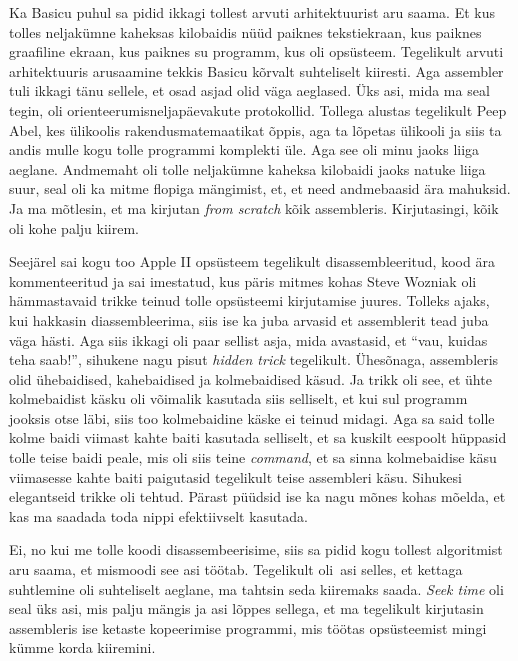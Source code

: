 
Ka Basicu puhul sa pidid ikkagi tollest arvuti arhitektuurist aru saama. Et kus 
tolles neljakümne kaheksas kilobaidis nüüd paiknes tekstiekraan, kus paiknes 
graafiline ekraan, kus paiknes su programm, kus oli opsüsteem. Tegelikult 
arvuti arhitektuuris arusaamine tekkis Basicu kõrvalt suhteliselt kiiresti. Aga 
assembler tuli ikkagi tänu sellele, et osad asjad olid väga aeglased. Üks asi, 
mida ma seal tegin, oli orienteerumisneljapäevakute protokollid. Tollega 
alustas tegelikult Peep Abel, kes ülikoolis 
rakendusmatemaatikat õppis, aga ta lõpetas ülikooli ja siis ta andis mulle kogu 
tolle programmi komplekti üle. Aga see oli minu jaoks liiga aeglane. Andmemaht 
oli tolle  neljakümne kaheksa kilobaidi jaoks natuke liiga suur, seal oli ka 
mitme flopiga mängimist, et, et need andmebaasid ära mahuksid. Ja ma mõtlesin, 
et ma kirjutan \emph{from scratch} kõik assembleris. Kirjutasingi, kõik oli 
kohe palju kiirem. 

Seejärel sai kogu too Apple II opsüsteem tegelikult disassembleeritud, kood ära 
kommenteeritud ja sai imestatud, kus päris mitmes kohas Steve Wozniak oli 
hämmastavaid trikke teinud tolle opsüsteemi kirjutamise juures. Tolleks ajaks, 
kui hakkasin diassembleerima, siis ise ka juba arvasid et assemblerit tead juba 
väga hästi. Aga siis ikkagi oli paar sellist asja, mida avastasid, et 
\enquote{vau, kuidas teha saab!}, sihukene nagu  pisut \emph{hidden trick} 
tegelikult. Ühesõnaga, assembleris olid ühebaidised, kahebaidised ja 
kolmebaidised käsud. Ja trikk oli see, et ühte kolmebaidist käsku oli võimalik 
kasutada siis selliselt, et kui sul programm jooksis otse läbi, siis too 
kolmebaidine käske ei teinud midagi. Aga sa said tolle kolme baidi viimast 
kahte baiti kasutada selliselt, et sa kuskilt eespoolt hüppasid tolle teise 
baidi peale, mis oli siis teine \emph{command}, et sa sinna kolmebaidise käsu 
viimasesse kahte baiti paigutasid tegelikult teise assembleri käsu. Sihukesi 
elegantseid trikke oli tehtud. Pärast püüdsid ise ka nagu mõnes kohas mõelda, 
et kas ma saadada toda nippi efektiivselt kasutada.


Ei, no kui me tolle koodi disassembeerisime, siis sa pidid kogu tollest 
algoritmist aru saama, et mismoodi see asi töötab. Tegelikult oli asi selles, 
et kettaga suhtlemine oli suhteliselt aeglane, ma tahtsin seda kiiremaks saada. 
\emph{Seek time} oli seal üks asi, mis palju mängis ja asi lõppes sellega, et 
ma tegelikult kirjutasin assembleris ise ketaste kopeerimise programmi, mis 
töötas   opsüsteemist mingi kümme korda kiiremini. 

